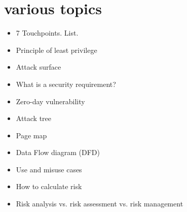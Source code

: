 \chapter{various topics}
	\begin{itemize}
		\item 7 Touchpoints. List.
		\item Principle of least privilege
		\item Attack surface
		\item What is a security requirement?
		\item Zero-day vulnerability
		\item Attack tree
		\item Page map
		\item Data Flow diagram (DFD)
		\item Use and misuse cases
		\item How to calculate risk
		\item Risk analysis vs. risk assessment vs. risk management
	\end{itemize}

	